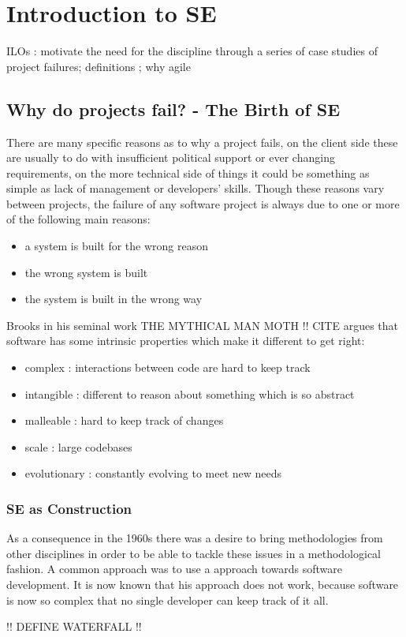 \section{Introduction to SE}

    ILOs : motivate the need for the discipline through a series of case studies of project
failures; definitions ; why agile

    \subsection{Why do projects fail? - The Birth of SE}

    \par{There are many specific reasons as to why a project fails, on the client side these are
        usually to do with insufficient political support or ever changing requirements, on the more
        technical side of things it could be something as simple as lack of management or
        developers' skills. Though these reasons vary between projects, the failure
    of any software project is always due to one or more of the following main reasons:}

        \begin{itemize}
            \item a system is built for the wrong reason  
            \item the wrong system is built
            \item the system is built in the wrong way
        \end{itemize}

    \par{Brooks in his seminal work THE MYTHICAL MAN MOTH !! CITE argues that software has some 
    intrinsic properties which make it different to get right:}

    \begin{itemize}
        \item complex : interactions between code are hard to keep track
        \item intangible : different to reason about something which is so abstract
        \item malleable : hard to keep track of changes
        \item scale : large codebases
        \item evolutionary : constantly evolving to meet new needs
    \end{itemize}
    
    \subsubsection{SE as Construction}

    \par{As a consequence in the 1960s there was a desire to bring methodologies from other
    disciplines in order to be able to tackle these issues in a methodological fashion. A common
approach was to use a  approach towards software development. It is now known that
his approach does not work, because software is now so complex that no single developer can keep
track of it all.}

    !! DEFINE WATERFALL !!

